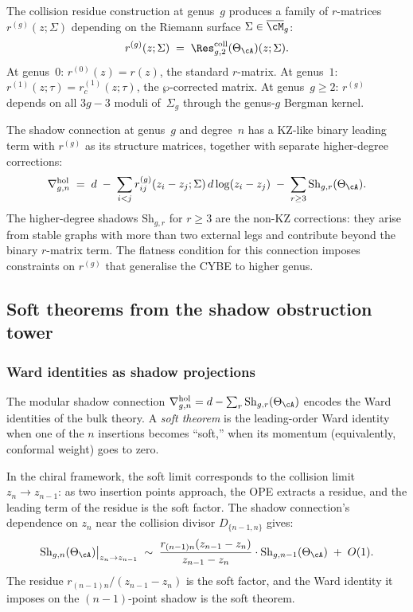 The collision residue construction at genus~$g$ produces a
family of $r$-matrices $r^{(g)}(z;\Sigma)$ depending on the
Riemann surface $\Sigma\in\overline{\cM}_g$:
\[
r^{(g)}(z;\Sigma)
\;=\;
\Res^{\mathrm{coll}}_{g,2}(\Theta_\cA)(z;\Sigma).
\]
At genus~$0$: $r^{(0)}(z)=r(z)$, the standard $r$-matrix.
At genus~$1$: $r^{(1)}(z;\tau)=r_c^{(1)}(z;\tau)$, the
$\wp$-corrected matrix. At genus~$g\ge 2$: $r^{(g)}$ depends
on all $3g-3$ moduli of~$\Sigma_g$ through the genus-$g$
Bergman kernel.

The shadow connection at genus~$g$ and degree~$n$ has a KZ-like
binary leading term with $r^{(g)}$ as its structure matrices,
together with separate higher-degree corrections:
\[
\nabla^{\mathrm{hol}}_{g,n}
\;=\;
d\;-\;\sum_{i<j}r^{(g)}_{ij}(z_i-z_j;\Sigma)
\,d\log(z_i-z_j)
\;-\;\sum_{r\ge 3}\mathrm{Sh}_{g,r}(\Theta_\cA).
\]
The higher-degree shadows $\mathrm{Sh}_{g,r}$ for $r\ge 3$ are the
non-KZ corrections: they arise from stable graphs with more than
two external legs and contribute beyond the binary $r$-matrix
term. The flatness condition for this connection imposes
constraints on $r^{(g)}$ that generalise the CYBE to higher genus.


\subsection*{Soft theorems from the shadow obstruction tower}

\subsubsection*{Ward identities as shadow projections}

The modular shadow connection
$\nabla^{\mathrm{hol}}_{g,n}=d-\sum_r\mathrm{Sh}_{g,r}
(\Theta_\cA)$ encodes the Ward identities of the bulk theory.
A \emph{soft theorem} is the leading-order Ward identity when one
of the $n$ insertions becomes ``soft,'' when its momentum
(equivalently, conformal weight) goes to zero.

In the chiral framework, the soft limit corresponds to the
collision limit $z_n\to z_{n-1}$: as two insertion points
approach, the OPE extracts a residue, and the leading term of the
residue is the soft factor. The shadow connection's dependence on
$z_n$ near the collision divisor $D_{\{n-1,n\}}$ gives:
\[
\mathrm{Sh}_{g,n}(\Theta_\cA)\big|_{z_n\to z_{n-1}}
\;\sim\;
\frac{r_{(n-1)n}(z_{n-1}-z_n)}{z_{n-1}-z_n}\cdot
\mathrm{Sh}_{g,n-1}(\Theta_\cA)
\;+\;O(1).
\]
The residue $r_{(n-1)n}/(z_{n-1}-z_n)$ is the soft factor,
and the Ward identity it imposes on the $(n-1)$-point shadow
is the soft theorem.

